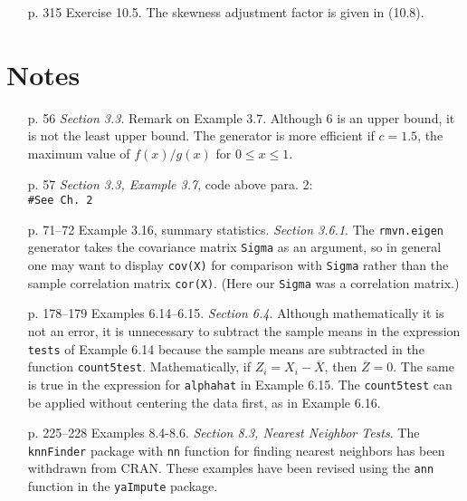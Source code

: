 \documentclass{article}
\begin{document}
\begin{enumerate}
 \item[p. 315]Exercise 10.5. The skewness adjustment factor is
 given in (10.8).

\end{enumerate}

\section{Notes}



\begin{enumerate}

 \item[p. 56] \emph{Section 3.3}.  Remark on Example 3.7. Although 6 is an upper bound, it
 is not the least upper bound. The generator is more efficient if
 $c=1.5$, the maximum value of $f(x)/g(x)$ for $0 \leq x \leq 1$.


 \item[p. 57] \emph{Section 3.3, Example 3.7}, code above para. 2:\\
  \texttt{\#See Ch. 2} 
 

 \item[p. 71--72]Example 3.16, summary statistics. \emph{Section 3.6.1}.
 The \texttt{rmvn.eigen} generator takes the
 covariance matrix \texttt{Sigma} as an argument, so in general one may
 want to display \texttt{cov(X)} for comparison with \texttt{Sigma} rather than the sample
 correlation matrix \texttt{cor(X)}. (Here our \texttt{Sigma}
 was a correlation matrix.)



 \item[p. 178--179]Examples 6.14--6.15.  \emph{Section 6.4}. 
 Although mathematically it is not
 an error, it is unnecessary to subtract the sample means in the
 expression \texttt{tests} of Example 6.14 because the sample
 means are subtracted in the function \texttt{count5test}.
 Mathematically, if $Z_i=X_i-\overline X$, then $\overline Z=0$.
 The same is true in the expression for \texttt{alphahat} in
 Example 6.15. The \texttt{count5test} can be
 applied without centering the data first, as in Example 6.16.


\item[p. 225--228]Examples 8.4-8.6.  \emph{Section 8.3, Nearest Neighbor Tests}.  
    The \texttt{knnFinder} package with \texttt{nn} function for finding nearest neighbors has been withdrawn from CRAN. These examples have been revised using the \texttt{ann} function in the \texttt{yaImpute} package.



\end{enumerate}
\end{document}
